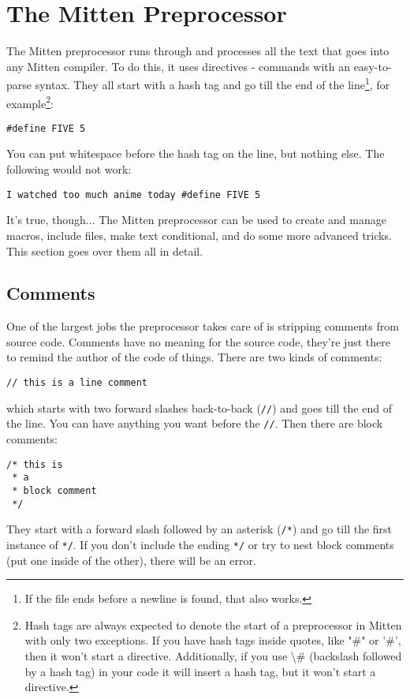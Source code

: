 \documentclass[10pt,a4paper]{article}
\begin{document}
\section{The Mitten Preprocessor}
The Mitten preprocessor runs through and processes all the text that goes into any Mitten compiler. To do this, it uses directives - commands with an easy-to-parse syntax. They all start with a hash tag and go till the end of the line\footnote{If the file ends before a newline is found, that also works.}, for example\footnote{Hash tags are always expected to denote the start of a preprocessor in Mitten with only two exceptions. If you have hash tags inside quotes, like "\#" or '\#', then it won't start a directive. Additionally, if you use \textbackslash\# (backslash followed by a hash tag) in your code it will insert a hash tag, but it won't start a directive.}:
\begin{verbatim}
#define FIVE 5
\end{verbatim}

You can put whitespace before the hash tag on the line, but nothing else. The following would not work:
\begin{verbatim}
I watched too much anime today #define FIVE 5
\end{verbatim}

It's true, though... The Mitten preprocessor can be used to create and manage macros, include files, make text conditional, and do some more advanced tricks. This section goes over them all in detail.

\newpage




\subsection{Comments}
One of the largest jobs the preprocessor takes care of is stripping comments from source code. Comments have no meaning for the source code, they're just there to remind the author of the code of things. There are two kinds of comments:
\begin{verbatim}
// this is a line comment
\end{verbatim}
which starts with two forward slashes back-to-back (\verb|//|) and goes till the end of the line. You can have anything you want before the \verb|//|. Then there are block comments:
\begin{verbatim}
/* this is 
 * a
 * block comment
 */
\end{verbatim}
They start with a forward slash followed by an asterisk (\verb|/*|) and go till the first instance of \verb|*/|. If you don't include the ending \verb|*/| or try to nest block comments (put one inside of the other), there will be an error.
\end{document}
